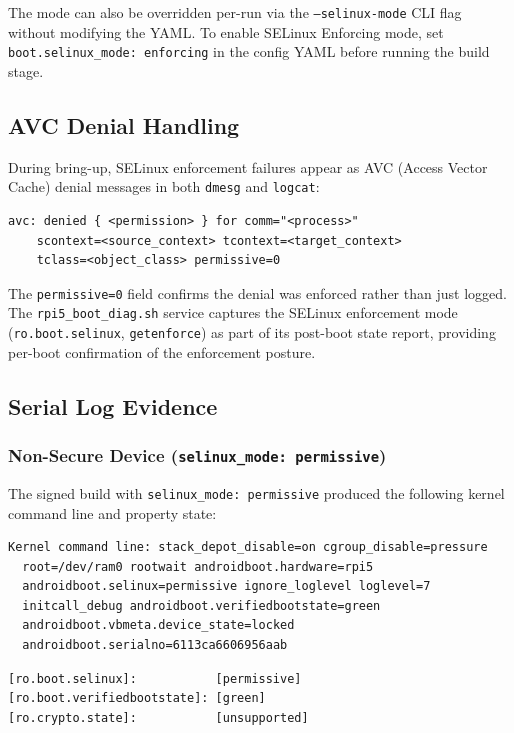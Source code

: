 The mode can also be overridden per-run via the \texttt{--selinux-mode} CLI flag without modifying the YAML. To enable SELinux Enforcing mode, set \texttt{boot.selinux\_mode: enforcing} in the config YAML before running the build stage.

\subsection{AVC Denial Handling}

During bring-up, SELinux enforcement failures appear as AVC (Access Vector Cache) denial messages in both \texttt{dmesg} and \texttt{logcat}:

\begin{lstlisting}
avc: denied { <permission> } for comm="<process>"
    scontext=<source_context> tcontext=<target_context>
    tclass=<object_class> permissive=0
\end{lstlisting}

The \texttt{permissive=0} field confirms the denial was enforced rather than just logged. The \texttt{rpi5\_boot\_diag.sh} service captures the SELinux enforcement mode (\texttt{ro.boot.selinux}, \texttt{getenforce}) as part of its post-boot state report, providing per-boot confirmation of the enforcement posture.

\subsection{Serial Log Evidence}
\label{sec:impl_selinux_logs}

\subsubsection*{Non-Secure Device (\texttt{selinux\_mode: permissive})}

The signed build with \texttt{selinux\_mode: permissive} produced the following kernel command line and property state:

\begin{lstlisting}[caption={Kernel command line --- permissive build}]
Kernel command line: stack_depot_disable=on cgroup_disable=pressure
  root=/dev/ram0 rootwait androidboot.hardware=rpi5
  androidboot.selinux=permissive ignore_loglevel loglevel=7
  initcall_debug androidboot.verifiedbootstate=green
  androidboot.vbmeta.device_state=locked
  androidboot.serialno=6113ca6606956aab
\end{lstlisting}

\begin{lstlisting}[caption={Selected getprop output --- permissive build}]
[ro.boot.selinux]:           [permissive]
[ro.boot.verifiedbootstate]: [green]
[ro.crypto.state]:           [unsupported]
\end{lstlisting}

